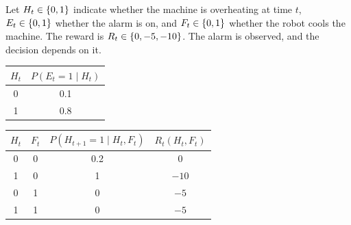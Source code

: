 \documentclass[11pt, a4paper]{exam}
\begin{document}
\begin{exercises}
\begin{parts}
    \begin{solution}
        Let $H_t \in \{0, 1\}$ indicate whether the machine is overheating at time $t$, $E_t \in \{0, 1\}$ whether the alarm is on, and $F_t \in \{0, 1\}$ whether the robot cools the machine. The reward is $R_t \in \{0, -5, -10\}$. The alarm is observed, and the decision depends on it.

        \begin{center}
        \end{center}

        \begin{center}
            \begin{tabular}{cc}
                \toprule
                $H_t$ & $P(E_t = 1 \mid H_t)$ \\
                \midrule
                0 & 0.1 \\
                1 & 0.8 \\
                \bottomrule
            \end{tabular}
            \qquad
            \begin{tabular}{cccc}
                \toprule
                $H_t$ & $F_t$ & $P(H_{t+1} = 1 \mid H_t, F_t)$ & $R_t(H_t, F_t)$ \\
                \midrule
                0 & 0 & 0.2 & 0 \\
                1 & 0 & 1 & $-10$ \\
                0 & 1 & 0 & $-5$ \\
                1 & 1 & 0 & $-5$ \\
                \bottomrule
            \end{tabular}
        \end{center}


\end{solution}
\end{parts}
\end{exercises}
\end{document}

